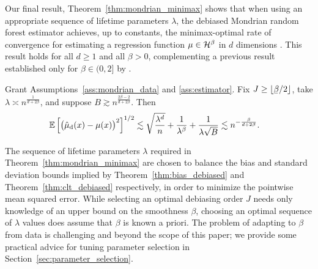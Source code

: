 Our final result, Theorem~\ref{thm:mondrian_minimax} shows that
when using an appropriate sequence of lifetime parameters $\lambda$,
the debiased Mondrian random forest estimator
achieves, up to constants, the minimax-optimal rate of convergence
for estimating a regression function $\mu \in \mathcal{H}^\beta$
in $d$ dimensions \citep{stone1982optimal}.
This result holds for all $d \geq 1$ and all $\beta > 0$,
complementing a previous result established only for $\beta \in (0, 2]$
by \citet{mourtada2020minimax}.
%
\begin{theorem}%
  \label{thm:mondrian_minimax}
  Grant Assumptions~\ref{ass:mondrian_data}
  and \ref{ass:estimator}.
  Fix $J \geq \lfloor \flbeta / 2 \rfloor$,
  take $\lambda \asymp n^{\frac{1}{d + 2 \beta}}$,
  and suppose
  $B \gtrsim n^{\frac{2 \beta - 2}{d + 2 \beta}}$.
  Then
  \begin{align*}
    \mathbb{E} \left[
      \big(
        \hat \mu_{\mathrm{d}}(x)
        - \mu(x)
      \big)^2
    \right]^{1/2}
    &\lesssim
    \sqrt{\frac{\lambda^d}{n}}
    + \frac{1}{\lambda^\beta}
    + \frac{1}{\lambda \sqrt B}
    \lesssim
    n^{-\frac{\beta}{d + 2 \beta}}.
  \end{align*}
\end{theorem}

The sequence of lifetime parameters $\lambda$ required in
Theorem~\ref{thm:mondrian_minimax} are
chosen to balance the bias and standard deviation bounds implied by
Theorem~\ref{thm:bias_debiased} and Theorem~\ref{thm:clt_debiased}
respectively, in order to minimize the pointwise mean squared error.
While selecting an optimal debiasing order $J$ needs only
knowledge of an upper bound on the smoothness $\beta$,
choosing an optimal sequence of $\lambda$ values
does assume that $\beta$ is known a priori.
The problem of adapting to $\beta$ from data is challenging
and beyond the scope of this paper; we provide some practical advice
for tuning parameter selection
in Section~\ref{sec:parameter_selection}.

